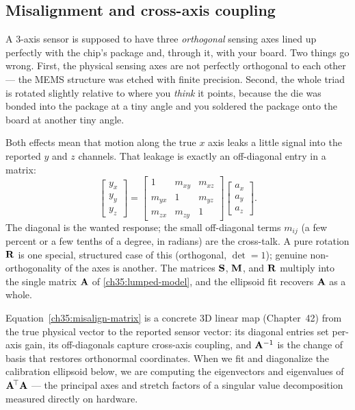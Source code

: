 \subsection{Misalignment and cross-axis coupling}
\label{ch35:misalign}

A 3-axis sensor is supposed to have three
\emph{orthogonal} sensing axes lined up perfectly with the chip's package and,
through it, with your board. Two things go wrong. First, the physical sensing
axes are not perfectly orthogonal to each other --- the MEMS structure was etched
with finite precision. Second, the whole triad is rotated slightly relative to
where you \emph{think} it points, because the die was bonded into the package at a
tiny angle and you soldered the package onto the board at another tiny angle.

Both effects mean that motion along the true $x$ axis leaks a little signal into
the reported $y$ and $z$ channels. That leakage is exactly an off-diagonal entry
in a matrix:
\begin{equation}
  \begin{bmatrix} y_x \\ y_y \\ y_z \end{bmatrix}
  =
  \begin{bmatrix}
    1 & m_{xy} & m_{xz} \\
    m_{yx} & 1 & m_{yz} \\
    m_{zx} & m_{zy} & 1
  \end{bmatrix}
  \begin{bmatrix} a_x \\ a_y \\ a_z \end{bmatrix}.
  \label{ch35:misalign-matrix}
\end{equation}
The diagonal is the wanted response; the small off-diagonal terms $m_{ij}$ (a few
percent or a few tenths of a degree, in radians) are the cross-talk. A pure
rotation $\mathbf{R}$ is one special, structured case of this (orthogonal, $\det=1$);
genuine non-orthogonality of the axes is another. The matrices $\mathbf{S}$, $\mathbf{M}$, and $\mathbf{R}$ multiply into the single matrix $\mathbf{A}$ of \eqref{ch35:lumped-model}, and the ellipsoid fit recovers $\mathbf{A}$ as a whole.

\begin{connectionbox}
Equation~\eqref{ch35:misalign-matrix} is a concrete 3D linear map (Chapter~42) from the
true physical vector to the reported sensor vector: its diagonal entries set per-axis gain,
its off-diagonals capture cross-axis coupling, and $\mathbf{A}^{-1}$ is the change of basis
that restores orthonormal coordinates. When we fit and diagonalize the calibration
ellipsoid below, we are computing the eigenvectors and eigenvalues of
$\mathbf{A}^{\!\top}\mathbf{A}$ --- the principal axes and stretch factors of a singular value
decomposition measured directly on hardware.
\end{connectionbox}

